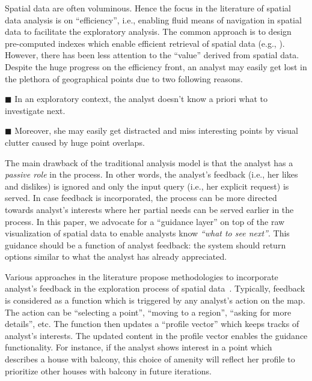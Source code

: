\documentclass[sigconf,edbt]{acmart-edbt2019}
\begin{document}
\vspace{3pt}
Spatial data are often voluminous. Hence the focus in the literature of spatial data analysis is on ``efficiency'', i.e., enabling fluid means of navigation in spatial data to facilitate the exploratory analysis. The common approach is to design pre-computed indexes which enable efficient retrieval of spatial data (e.g., \cite{lins2013nanocubes,yu2018spatial}). However, there has been less attention to the ``value'' derived from spatial data. Despite the huge progress on the efficiency front, an analyst may easily get lost in the plethora of geographical points due to two following reasons.

\vspace{3pt}
\noindent $\blacksquare$ In an exploratory context, the analyst doesn't know a priori what to investigate next.

\vspace{2pt}
\noindent $\blacksquare$ Moreover, she may easily get distracted and miss interesting points by visual clutter caused by huge point overlaps.

\vspace{3pt}
The main drawback of the traditional analysis model is that the analyst has a {\em passive role} in the process. In other words, the analyst's feedback (i.e., her likes and dislikes) is ignored and only the input query (i.e., her explicit request) is served. In case feedback is incorporated, the process can be more directed towards analyst's interests where her partial needs can be served earlier in the process. In this paper, we advocate for a ``guidance layer'' on top of the raw visualization of spatial data to enable analysts know {\em ``what to see next''}. This guidance should be a function of analyst feedback: the system should return options similar to what the analyst has already appreciated. 

\vspace{2pt}
Various approaches in the literature propose methodologies to incorporate analyst's feedback in the exploration process of spatial data~\cite{Ballatore2008,Liu:2010,xin2006discovering,bhuiyan2012interactive}. Typically, feedback is considered as a function which is triggered by any analyst's action on the map. The action can be ``selecting a point'', ``moving to a region'', ``asking for more details'', etc. The function then updates a ``profile vector'' which keeps tracks of analyst's interests. The updated content in the profile vector enables the guidance functionality. For instance, if the analyst shows interest in a point which describes a house with balcony, this choice of amenity will reflect her profile to prioritize other houses with balcony in future iterations.
\end{document}

